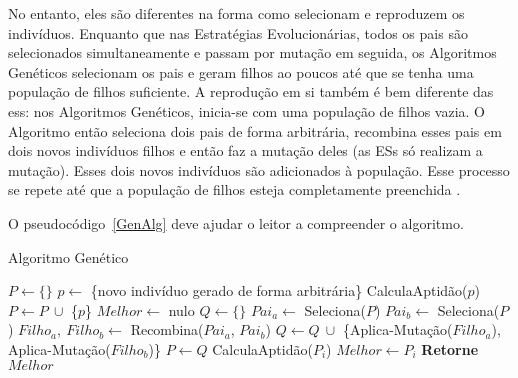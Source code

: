No entanto, eles são diferentes na forma como selecionam e reproduzem os 
indivíduos. Enquanto que nas Estratégias Evolucionárias, todos os pais são 
selecionados simultaneamente e passam por mutação em seguida, os Algoritmos 
Genéticos selecionam os pais e geram filhos ao poucos até que se tenha uma 
população de filhos suficiente. A reprodução em si também é bem diferente das 
\acp{es}: nos Algoritmos Genéticos, inicia-se com uma população de filhos vazia. 
O Algoritmo então seleciona dois pais de forma arbitrária, recombina esses pais 
em dois novos indivíduos filhos e então faz a mutação deles (as \acp{ES} só 
realizam a mutação). Esses dois novos indivíduos são adicionados à população. 
Esse processo se repete até que a população de filhos esteja completamente 
preenchida \citep{Luke2013Metaheuristics}.

O pseudocódigo~\ref{GenAlg} deve ajudar o leitor a compreender o algoritmo.

\begin{algorithm}[h]                      %
	\caption{Algoritmo Genético}          %
	\label{GenAlg}                           %
	\begin{algorithmic}                    %
		\State $P \gets \{\} $
			\State $p \gets$ \{novo indivíduo gerado de forma arbitrária\}
			\State CalculaAptidão($p$)
			\State $P \gets P \ \cup $ \{$p$\} 
		\EndFor
		\State $Melhor \gets$ nulo
		\Repeat
			\State $Q \gets \{\}$
				\State $Pai_{a} \gets $ Seleciona($P$)
				\State $Pai_{b} \gets $ Seleciona($P$)
				\State $Filho_{a},\ Filho_{b} \gets $ Recombina($Pai_{a}$, $Pai_{b}$)
				\State $Q \gets Q\ \cup $ \{Aplica-Mutação($Filho_{a}$), Aplica-Mutação($Filho_{b}$)\}
			\EndFor
			\State $P \gets Q$
				\State CalculaAptidão($P_{i}$)
					\State $Melhor \gets P_{i}$
				\EndIf
			\EndFor
		\State \textbf{Retorne} $Melhor$
		\EndProcedure
	\end{algorithmic}
\end{algorithm}

